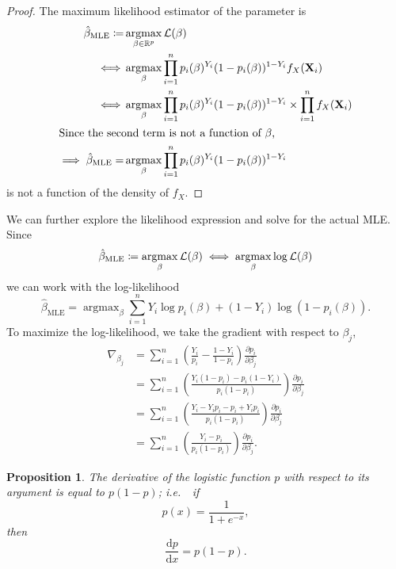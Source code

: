 \documentclass[letterpaper, reqno]{amsart}
\newtheorem{prop}{Proposition}[section]
\numberwithin{equation}{section}
\newcommand{\vect}[1]{\boldsymbol{\mathbf{#1}}} %
\newcommand{\ie}{\emph{i.e.\ }}
\newcommand{\dd}{\mathrm{d}}
\newcommand{\ddx}[2]{\frac{\dd #1}{\dd #2}}
\newcommand{\ppx}[2]{\frac{\partial #1}{\partial #2}}
\newcommand{\Li}[1]{\mathcal{L}\mleft( #1 \mright)}  %
\newcommand{\R}{\mathbb{R}}  %
\newcommand{\sumi}[2]{\sum_{#1=1}^{#2}}
\newcommand{\Xv}{\vect{X}}
\newcommand{\Bv}{\beta}
\newcommand{\Bvh}{\hat{\beta}}
\DeclareMathOperator*{\argmax}{argmax}
\begin{document}
\begin{proof}
  The maximum likelihood estimator of the parameter is
  \begin{align*}
    \Bvh_\mathrm{MLE} \coloneqq& \argmax_{\Bv \in \R^p} \Li{\Bv} \\
    \iff &\argmax_\Bv \prod_{i=1}^n p_i(\Bv)^{Y_i} (1 - p_i(\Bv))^{1 - Y_i} f_X(\Xv_i) \\
    \iff &\argmax_\Bv \prod_{i=1}^n p_i(\Bv)^{Y_i} (1 - p_i(\Bv))^{1 - Y_i} \times \prod_{i=1}^n f_X(\Xv_i) \\
    \intertext{Since the second term is not a function of $\Bv$,}
    \implies \Bvh_\mathrm{MLE} =& \argmax_\Bv \prod_{i=1}^n p_i(\Bv)^{Y_i} (1 - p_i(\Bv))^{1 - Y_i}
  \end{align*}
  is not a function of the density of $f_X$.
\end{proof}

We can further explore the likelihood expression and solve for the actual MLE.
Since
\[ \Bvh_\mathrm{MLE} \coloneqq \argmax_\Bv \Li{\Bv} 
                          \iff \argmax_\Bv \log \Li{\Bv} \]
we can work with the log-likelihood
\[ \Bvh_\mathrm{MLE} = \argmax_\Bv \sumi{i}{n} Y_i \log p_i(\Bv) + (1 - Y_i) \log (1 - p_i(\Bv)). \]
To maximize the log-likelihood, we take the gradient with respect to $\Bv_j$,
\begin{align*}
  \nabla_{\Bv_j} &= \sumi{i}{n} \left( \frac{Y_i}{p_i} - \frac{1 - Y_i}{1 - p_i} \right) \ppx{p_i}{\Bv_j} \\
  &= \sumi{i}{n} \left( \frac{Y_i(1 - p_i) - p_i(1 - Y_i)}{p_i(1 - p_i)} \right) \ppx{p_i}{\Bv_j} \\
  &= \sumi{i}{n} \left( \frac{Y_i - Y_i p_i - p_i + Y_i p_i}{p_i(1 - p_i)} \right) \ppx{p_i}{\Bv_j} \\
  &= \sumi{i}{n} \left( \frac{Y_i - p_i}{p_i(1 - p_i)} \right) \ppx{p_i}{\Bv_j}.
\end{align*}

\begin{prop}
  The derivative of the logistic function $p$ with respect to its argument is
  equal to $p(1 - p)$; \ie\ if
  \[ p(x) = \frac{1}{1 + e^{-x}}, \]
  then
  \[ \ddx{p}{x} = p(1 - p). \]
\end{prop}
\end{document}
